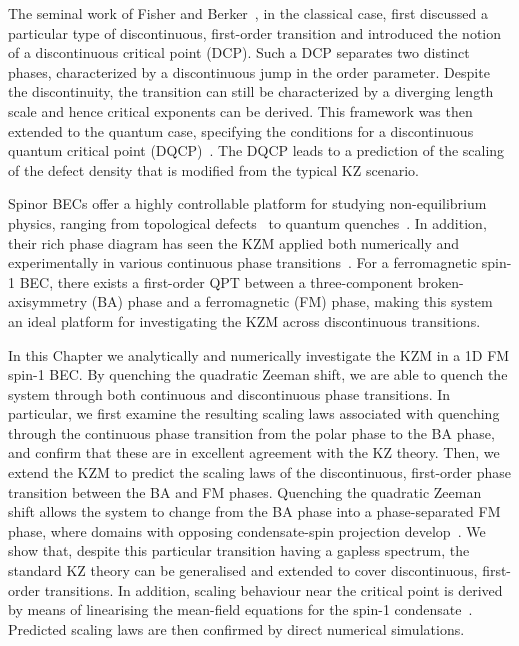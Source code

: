 The seminal work of Fisher and Berker~\cite{Fisher1982}, in the classical case,
first discussed a particular type of discontinuous, first-order transition and
introduced the notion of a discontinuous critical point (DCP).
Such a DCP separates two distinct phases, characterized by a discontinuous jump
in the order parameter.
Despite the discontinuity, the transition can still be characterized by a
diverging length scale and hence critical exponents can be derived.
This framework was then extended to the quantum case, specifying the conditions
for a discontinuous quantum critical point (DQCP)~\cite{Suzuki2015}.
The DQCP leads to a prediction of the scaling of the defect density that is
modified from the typical KZ scenario.

Spinor BECs offer a highly controllable platform for studying non-equilibrium
physics, ranging from topological defects~\cite{Lovegrove2014, Borgh2016} to
quantum quenches~\cite{Symes2017, Prufer2018, Schmied2019}.
In addition, their rich phase diagram has seen the KZM applied both numerically
and experimentally in various continuous phase transitions~\cite{Damski2007,
    Saito2007, Saito2007a, Swislocki2013, Witkowska2013, Anquez2016}.
For a ferromagnetic spin-1 BEC, there exists a first-order QPT between a
three-component broken-axisymmetry (BA) phase and a ferromagnetic (FM) phase,
making this system an ideal platform for investigating the KZM across
discontinuous transitions.

In this Chapter we analytically and numerically investigate the KZM in a 1D FM
spin-1 BEC\@.
By quenching the quadratic Zeeman shift, we are able to quench the system
through both continuous and discontinuous phase transitions.
In particular, we first examine the resulting scaling laws associated with
quenching through the continuous phase transition from the polar phase to the
BA phase, and confirm that these are in excellent agreement with the KZ theory.
Then, we extend the KZM to predict the scaling laws of the discontinuous,
first-order phase transition between the BA and FM phases.
Quenching the quadratic Zeeman shift allows the system to change from the
BA phase into a phase-separated FM phase, where domains with opposing
condensate-spin projection develop~\cite{Kawaguchi2012}.
We show that, despite this particular transition having a gapless spectrum, the
standard KZ theory can be generalised and extended to cover discontinuous,
first-order transitions.
In addition, scaling behaviour near the critical point is derived by means of
linearising the mean-field equations for the spin-1
condensate~\cite{Damski2007, Uchino2010}.
Predicted scaling laws are then confirmed by direct numerical simulations.

